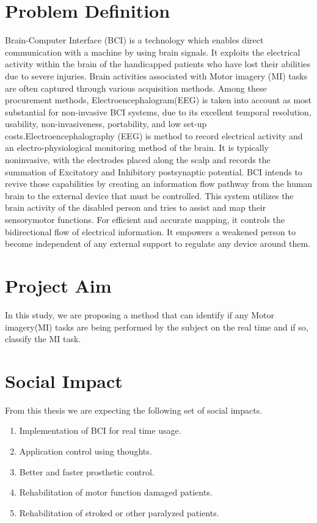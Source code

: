 \documentclass[12pt,a4paper]{report}
\begin{document}
	\section{Problem Definition}
\justify Brain-Computer Interface (BCI) is a technology which enables direct communication with a machine by using brain signals. It exploits the electrical activity within the brain of the handicapped patients who have lost their abilities due to severe injuries. Brain activities associated with Motor imagery (MI) tasks are often captured through various acquisition methods. Among these procurement methods, Electroencephalogram(EEG) is taken into account as most substantial for non-invasive BCI systems, due to its excellent temporal resolution, usability, non-invasiveness, portability, and low set-up costs.Electroencephalography (EEG) is method to record electrical activity and an electro-physiological monitoring method of the brain. It is typically noninvasive, with the electrodes placed along the scalp and records the summation of Excitatory and Inhibitory postsynaptic potential. BCI intends to revive those capabilities by creating an information flow pathway from the human brain to the external device that must be controlled. This system utilizes the brain activity of the disabled person and tries to assist and map their sensorymotor functions. For efficient and accurate mapping, it controls the bidirectional flow of electrical information. It empowers a weakened person to become independent of any external support to regulate any device around them. 

\section{Project Aim}
\justify In this study, we are proposing a method that can identify if any Motor imagery(MI) tasks are being performed by the subject on the real time and if so, classify the MI task. 
\section{Social Impact}	
\justify From this thesis we are expecting the following set of social impacts. 
\begin{enumerate}
	\item Implementation of BCI for real time usage.
	\item Application control using thoughts.
	\item Better and faster prosthetic control.
	\item Rehabilitation of motor function damaged patients. 
	\item Rehabilitation of stroked or other paralyzed patients.
	
\end{enumerate}
\end{document}
